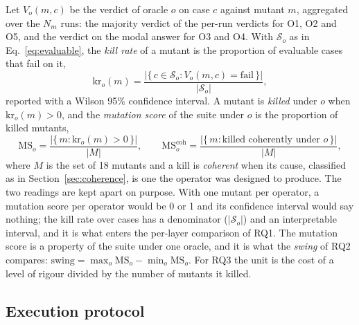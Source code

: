 \documentclass[a4paper,fleqn]{cas-dc}
\newcommand{\Sset}{\mathcal{S}}
\newcommand{\kr}{\mathrm{kr}}
\newcommand{\MS}{\mathrm{MS}}
\newcommand{\fail}{\mathrm{fail}}
\begin{document}
Let $V_o(m, c)$ be the verdict of oracle $o$ on case $c$ against mutant $m$,
aggregated over the $N_m$ runs: the majority verdict of the per-run verdicts
for O1, O2 and O5, and the verdict on the modal answer for O3 and O4. With
$\Sset_o$ as in Eq.~\eqref{eq:evaluable}, the \emph{kill rate} of a mutant is
the proportion of evaluable cases that fail on it,
\begin{equation}
\label{eq:killrate}
\kr_o(m) = \frac{\bigl|\{\, c \in \Sset_o : V_o(m, c) = \fail \,\}\bigr|}{|\Sset_o|},
\end{equation}
reported with a Wilson 95\% confidence interval. A mutant is \emph{killed}
under $o$ when $\kr_o(m) > 0$, and the \emph{mutation score} of the suite
under $o$ is the proportion of killed mutants,
\begin{equation}
\label{eq:ms}
\MS_o = \frac{\bigl|\{\, m : \kr_o(m) > 0 \,\}\bigr|}{|M|}, \qquad
\MS^{\mathrm{coh}}_o = \frac{\bigl|\{\, m : \text{killed coherently under } o \,\}\bigr|}{|M|},
\end{equation}
where $M$ is the set of 18 mutants and a kill is \emph{coherent} when its
cause, classified as in Section~\ref{sec:coherence}, is one the operator was
designed to produce. The two readings are kept apart on purpose. With one
mutant per operator, a mutation score per operator would be 0 or 1 and its
confidence interval would say nothing; the kill rate over cases has a
denominator ($|\Sset_o|$) and an interpretable interval, and it is what enters
the per-layer comparison of RQ1. The mutation score is a property of the suite
under one oracle, and it is what the \emph{swing} of RQ2 compares:
$\mathrm{swing} = \max_o \MS_o - \min_o \MS_o$. For RQ3 the unit is the cost
of a level of rigour divided by the number of mutants it killed.

\subsection{Execution protocol}
\label{sec:execution}
\end{document}
